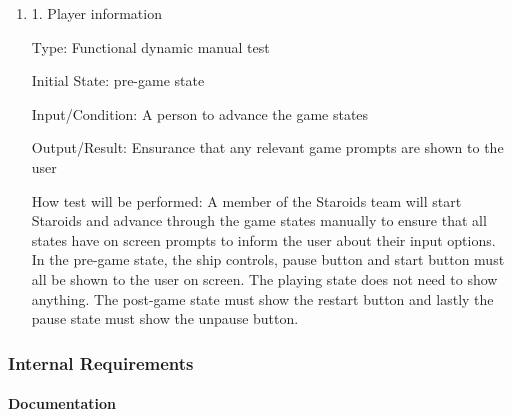 \documentclass[12pt, titlepage]{article}
\begin{document}
\begin{enumerate}

\item{1. Player information\\}

Type: Functional dynamic manual test

Initial State: pre-game state

Input/Condition: A person to advance the game states

Output/Result: Ensurance that any relevant game prompts are shown to the user

How test will be performed: A member of the Staroids team will start Staroids and advance through the game states manually to ensure that all states have on screen prompts to inform the user about their input options. In the pre-game state, the ship controls, pause button and start button must all be shown to the user on screen. The playing state does not need to show anything. The post-game state must show the restart button and lastly the pause state must show the unpause button.

\end{enumerate}

\subsubsection{Internal Requirements}

\paragraph{Documentation}
\end{document}
